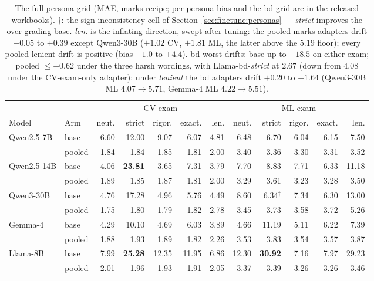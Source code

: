 \begin{table}[t]
\centering
\caption{The full persona grid (MAE, marks recipe; per-persona bias and the bd grid are in the released workbooks). $\dagger$: the sign-inconsistency cell of Section~\ref{sec:finetune:personas} --- \emph{strict} improves the over-grading base. \emph{len.} is the inflating direction, swept after tuning: the pooled marks adapters drift $+0.05$ to $+0.39$ except Qwen3-$30$B ($+1.02$ CV, $+1.81$ ML, the latter above the $5.19$ floor); every pooled lenient drift is positive (bias $+1.0$ to $+4.4$). bd worst drifts: base up to $+18.5$ on either exam; pooled $\le +0.62$ under the three harsh wordings, with Llama-bd-\emph{strict} at $2.67$ (down from $4.08$ under the CV-exam-only adapter); under \emph{lenient} the bd adapters drift $+0.20$ to $+1.64$ (Qwen3-$30$B ML $4.07 \to 5.71$, Gemma-$4$ ML $4.22 \to 5.51$).}
\label{tab:ftpersonafull}
\small
\setlength{\tabcolsep}{3pt}
\begin{tabular}{llrrrrrrrrrr}
\toprule
& & \multicolumn{5}{c}{CV exam} & \multicolumn{5}{c}{ML exam} \\
\cmidrule(lr){3-7}\cmidrule(lr){8-12}
Model & Arm & neut. & strict & rigor. & exact. & len. & neut. & strict & rigor. & exact. & len. \\
\midrule
Qwen2.5-7B  & base   & 6.60 & 12.00 & 9.07 & 6.07 & 4.81 & 6.48 & 6.70 & 6.04 & 6.15 & 7.50 \\
            & pooled & 1.84 & 1.84 & 1.85 & 1.81 & 2.00 & 3.40 & 3.36 & 3.30 & 3.31 & 3.52 \\
Qwen2.5-14B & base   & 4.06 & \textbf{23.81} & 3.65 & 7.31 & 3.79 & 7.70 & 8.83 & 7.71 & 6.33 & 11.18 \\
            & pooled & 1.89 & 1.85 & 1.87 & 1.81 & 2.00 & 3.29 & 3.61 & 3.23 & 3.28 & 3.50 \\
Qwen3-30B   & base   & 4.76 & 17.28 & 4.96 & 5.76 & 4.49 & 8.60 & 6.34$^\dagger$ & 7.34 & 6.30 & 13.00 \\
            & pooled & 1.75 & 1.80 & 1.79 & 1.82 & 2.78 & 3.45 & 3.73 & 3.58 & 3.72 & 5.26 \\
Gemma-4     & base   & 4.29 & 10.10 & 4.69 & 6.03 & 3.89 & 4.66 & 11.19 & 5.11 & 6.22 & 7.39 \\
            & pooled & 1.88 & 1.93 & 1.89 & 1.82 & 2.26 & 3.53 & 3.83 & 3.54 & 3.57 & 3.87 \\
Llama-8B    & base   & 7.99 & \textbf{25.28} & 12.35 & 11.95 & 6.86 & 12.30 & \textbf{30.92} & 7.16 & 7.97 & 29.23 \\
            & pooled & 2.01 & 1.96 & 1.93 & 1.91 & 2.05 & 3.37 & 3.39 & 3.26 & 3.26 & 3.46 \\
\bottomrule
\end{tabular}
\end{table}


